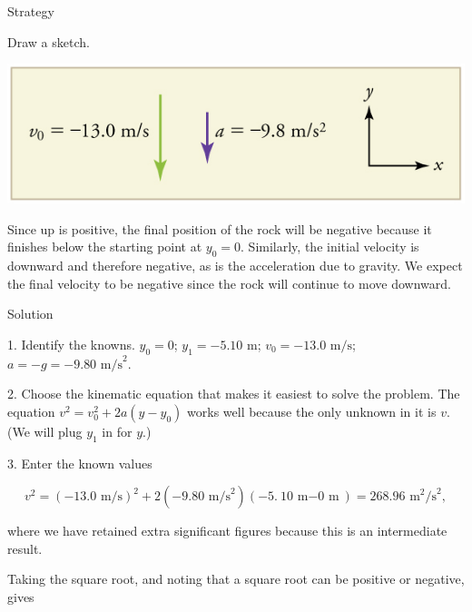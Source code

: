 \documentclass[
]{book}
\newenvironment{tinysection}{}{}
\begin{document}
\begin{tinysection}

{Strategy}

\end{tinysection}

Draw a sketch.

\includegraphics{images/Figure_02_06_01a.jpg}

Since up is positive, the final position of the rock will be negative
because it finishes below the starting point at \({y_{0} = 0}{}\).
Similarly, the initial velocity is downward and therefore negative, as
is the acceleration due to gravity. We expect the final velocity to be
negative since the rock will continue to move downward.

\begin{tinysection}

{Solution}

\end{tinysection}

1. Identify the knowns. \(y_{0} = 0\);
\({y_{1}{= - 5}}\text{.}\text{10\ m}\);
\(v_{0} = {- \text{13}}\text{.0\ m/s}\);
\({{{a = {- g}} = {- 9}}\text{.}\text{80\ m}\text{/s}^{2}}{}\).

2. Choose the kinematic equation that makes it easiest to solve the
problem. The equation \({{v^{2} = {v_{0}^{2} + 2a}}({y - y_{0}})}{}\)
works well because the only unknown in it is \(v{}\). (We will plug
\(y_{1}{}\) in for \(y{}\).)

3. Enter the known values

\leavevmode\hypertarget{import-auto-id2025017}{}%
\[{{{v^{2} = {\left( {{- \text{13}}\text{.}\text{0\ m/s}} \right)^{2} + 2}}\left( {{- 9}\text{.}\text{80\ m/s}^{2}} \right){\left( {{- 5}\text{.}{\text{10\ m} - \text{0\ m}}} \right) = \text{268}}\text{.}\text{96\ m}^{2}\text{/s}^{2}},}{}\]

where we have retained extra significant figures because this is an
intermediate result.

Taking the square root, and noting that a square root can be positive or
negative, gives
\end{document}
